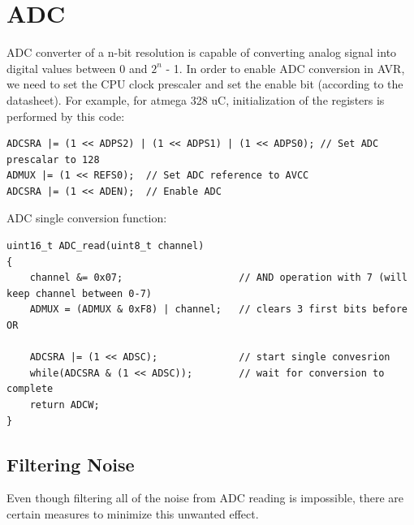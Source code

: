 \documentclass{article}
\begin{document}
\section{ADC}
ADC converter of a n-bit resolution is capable of converting analog signal into digital values between 0 and $2^n$ - 1.
In order to enable ADC conversion in AVR, we need to set the CPU clock prescaler and set the enable bit (according to the datasheet). For example, for atmega 328 uC, initialization of the registers is performed by this code:

\begin{verbatim}
ADCSRA |= (1 << ADPS2) | (1 << ADPS1) | (1 << ADPS0); // Set ADC prescalar to 128 
ADMUX |= (1 << REFS0); 	// Set ADC reference to AVCC
ADCSRA |= (1 << ADEN);  // Enable ADC
\end{verbatim}
%
ADC single conversion function:
\begin{verbatim}
uint16_t ADC_read(uint8_t channel)		
{
	channel &= 0x07;					// AND operation with 7 (will keep channel between 0-7) 
	ADMUX = (ADMUX & 0xF8) | channel;	// clears 3 first bits before OR

	ADCSRA |= (1 << ADSC);				// start single convesrion
	while(ADCSRA & (1 << ADSC));		// wait for conversion to complete
	return ADCW;
}
\end{verbatim}

\subsection{Filtering Noise}
Even though filtering all of the noise from ADC reading is impossible, there are certain measures to minimize this unwanted effect.
\end{document}
